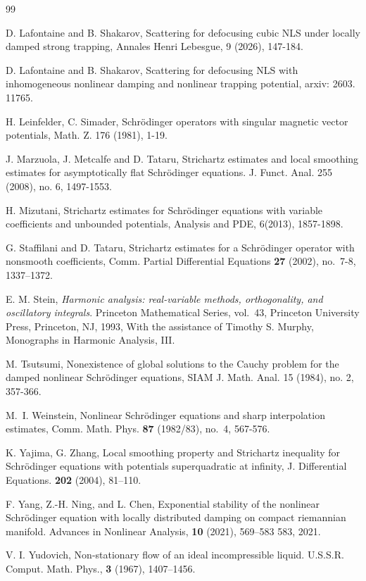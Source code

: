 \documentclass[10pt%
]{amsart}
\numberwithin{equation}{section}
\theoremstyle{definition}
\begin{document}
\begin{thebibliography}{99}
	
	
	 D. Lafontaine and B. Shakarov, Scattering for defocusing cubic NLS under locally damped strong trapping, Annales Henri Lebesgue, 9 (2026), 147-184.
	
	 D. Lafontaine and B. Shakarov, Scattering for defocusing NLS with inhomogeneous nonlinear damping and nonlinear trapping potential, arxiv: 2603. 11765.
	
	H. Leinfelder, C. Simader, Schr\"odinger operators with singular magnetic vector potentials, Math. Z. 176 (1981), 1-19.		

J. Marzuola, J. Metcalfe and D. Tataru, Strichartz estimates and local smoothing estimates for asymptotically flat Schr\"odinger equations.
J. Funct. Anal. 255 (2008), no. 6, 1497-1553.
	
	 H. Mizutani, Strichartz estimates for Schr\"odinger equations with variable coefficients and unbounded potentials,  Analysis and PDE, 6(2013), 1857-1898.
	
	G. Staffilani and D. Tataru, Strichartz estimates for a Schr\"odinger operator with nonsmooth coefficients, Comm. Partial Differential Equations {\bf 27} (2002), no.~7-8, 1337--1372.
	
	 E. M. Stein, \emph{Harmonic analysis: real-variable methods, orthogonality, and oscillatory integrals}. Princeton Mathematical Series, vol.~43, Princeton University Press, Princeton, NJ, 1993, With the assistance of Timothy S. Murphy, Monographs in Harmonic Analysis, III.
	
	
	 M. Tsutsumi, Nonexistence of global solutions to the Cauchy problem for the damped nonlinear Schr\"odinger equations, SIAM J. Math. Anal. 15 (1984), no. 2, 357-366.
	
	M.~I. Weinstein, Nonlinear Schr\"odinger equations and sharp interpolation estimates, Comm. Math. Phys. {\bf 87} (1982/83), no.~4, 567-576.
	
	 K. Yajima, G. Zhang, Local smoothing property and Strichartz inequality for Schr\"odinger equations with potentials superquadratic at infinity, J. Differential Equations. \textbf{202} (2004), 81--110. 
	
	 F. Yang, Z.-H. Ning, and L. Chen, Exponential stability of the nonlinear Schr\"odinger equation with locally distributed damping on compact riemannian manifold. Advances in Nonlinear Analysis, \textbf{10} (2021), 569--583
	583, 2021.
	
	 V. I. Yudovich, Non-stationary flow of an ideal incompressible liquid. U.S.S.R. Comput.  Math. Phys., \textbf{3} (1967), 1407--1456.
	
\end{thebibliography}
\end{document}
